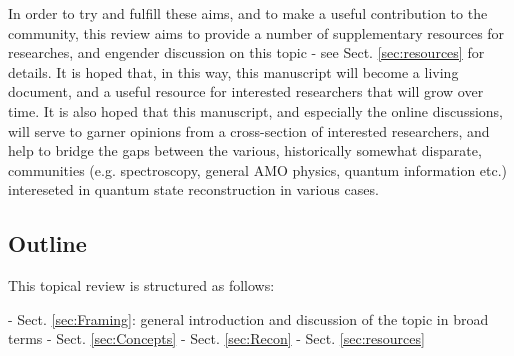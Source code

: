 
In order to try and fulfill these aims, and to make a useful contribution to the community, this review aims to provide a number of supplementary resources for researches, and engender discussion on this topic - see Sect. \ref{sec:resources} for details.
It is hoped that, in this way, this manuscript will become a living document, and a useful resource for interested researchers that will grow over time. It is also hoped that this manuscript, and especially the online discussions, will serve  to garner opinions from a cross-section of interested researchers, and help to bridge the gaps between the various, historically somewhat disparate, communities (e.g. spectroscopy, general AMO physics, quantum information etc.) intereseted in quantum state reconstruction in various cases.

\subsection{Outline}

This topical review is structured as follows:

- Sect. \ref{sec:Framing}: general introduction and discussion of the topic in broad terms
- Sect. \ref{sec:Concepts}
- Sect. \ref{sec:Recon}
- Sect. \ref{sec:resources}
